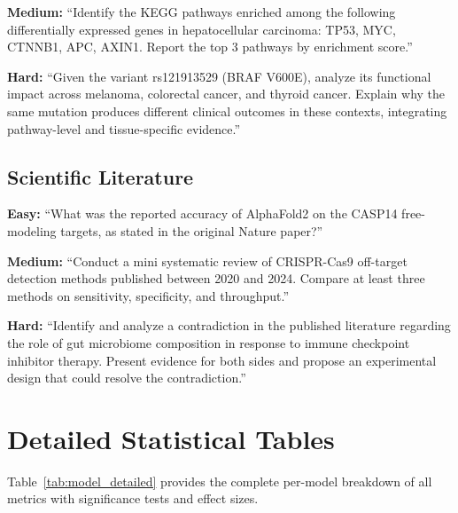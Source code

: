 \documentclass{article}
\begin{document}
\textbf{Medium:} ``Identify the KEGG pathways enriched among the following differentially expressed genes in hepatocellular carcinoma: TP53, MYC, CTNNB1, APC, AXIN1. Report the top 3 pathways by enrichment score.''

\textbf{Hard:} ``Given the variant rs121913529 (BRAF V600E), analyze its functional impact across melanoma, colorectal cancer, and thyroid cancer. Explain why the same mutation produces different clinical outcomes in these contexts, integrating pathway-level and tissue-specific evidence.''

\subsection{Scientific Literature}

\textbf{Easy:} ``What was the reported accuracy of AlphaFold2 on the CASP14 free-modeling targets, as stated in the original Nature paper?''

\textbf{Medium:} ``Conduct a mini systematic review of CRISPR-Cas9 off-target detection methods published between 2020 and 2024. Compare at least three methods on sensitivity, specificity, and throughput.''

\textbf{Hard:} ``Identify and analyze a contradiction in the published literature regarding the role of gut microbiome composition in response to immune checkpoint inhibitor therapy. Present evidence for both sides and propose an experimental design that could resolve the contradiction.''

\section{Detailed Statistical Tables}
\label{app:stats}

Table~\ref{tab:model_detailed} provides the complete per-model breakdown of all metrics with significance tests and effect sizes.
\end{document}
